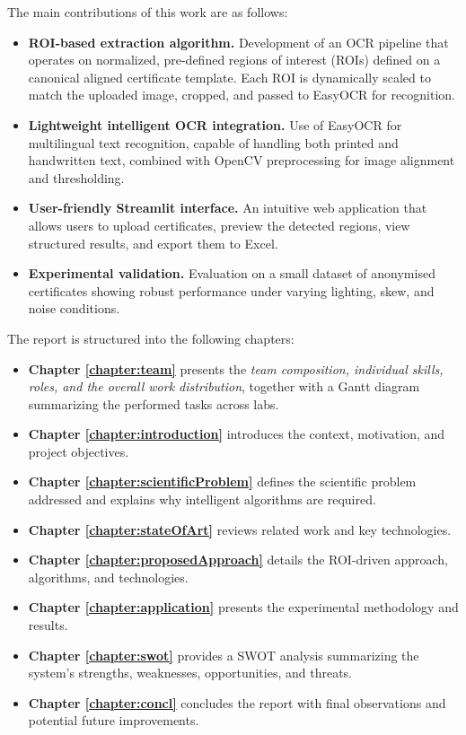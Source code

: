 \documentclass[runningheads,a4paper,11pt]{report}
\begin{document}
The main contributions of this work are as follows:
\begin{itemize}
  \item \textbf{ROI-based extraction algorithm.}  
  Development of an OCR pipeline that operates on normalized, pre-defined regions of interest (ROIs) defined on a canonical aligned certificate template.  
  Each ROI is dynamically scaled to match the uploaded image, cropped, and passed to EasyOCR for recognition.
  \item \textbf{Lightweight intelligent OCR integration.}  
  Use of EasyOCR for multilingual text recognition, capable of handling both printed and handwritten text, combined with OpenCV preprocessing for image alignment and thresholding.
  \item \textbf{User-friendly Streamlit interface.}  
  An intuitive web application that allows users to upload certificates, preview the detected regions, view structured results, and export them to Excel.
  \item \textbf{Experimental validation.}  
  Evaluation on a small dataset of anonymised certificates showing robust performance under varying lighting, skew, and noise conditions.
\end{itemize}

The report is structured into the following chapters:
\begin{itemize}
\item \textbf{Chapter \ref{chapter:team}} presents the \textit{team composition, individual skills, roles, and the overall work distribution}, together with a Gantt diagram summarizing the performed tasks across labs.
  \item \textbf{Chapter \ref{chapter:introduction}} introduces the context, motivation, and project objectives.  
  \item \textbf{Chapter \ref{chapter:scientificProblem}} defines the scientific problem addressed and explains why intelligent algorithms are required.  
  \item \textbf{Chapter \ref{chapter:stateOfArt}} reviews related work and key technologies.  
  \item \textbf{Chapter \ref{chapter:proposedApproach}} details the ROI-driven approach, algorithms, and technologies.  
  \item \textbf{Chapter \ref{chapter:application}} presents the experimental methodology and results.  
  \item \textbf{Chapter \ref{chapter:swot}} provides a SWOT analysis summarizing the system's strengths, weaknesses, opportunities, and threats.  
  \item \textbf{Chapter \ref{chapter:concl}} concludes the report with final observations and potential future improvements.
\end{itemize}
\end{document}
